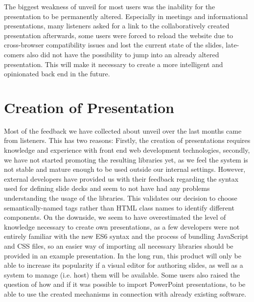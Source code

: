 The biggest weakness of unveil for most users was the inability for the presentation to be permanently altered. Especially in meetings and informational presentations, many listeners asked for a link to the collaboratively created presentation afterwards, some users were forced to reload the website due to cross-browser compatibility issues and lost the current state of the slides, late-comers also did not have the possibility to jump into an already altered presentation. This will make it necessary to create a more intelligent and opinionated back end in the future.

\section{Creation of Presentation}
Most of the feedback we have collected about unveil over the last months came from listeners. This has two reasons: Firstly, the creation of presentations requires knowledge and experience with front end web development technologies, secondly, we have not started promoting the resulting libraries yet, as we feel the system is not stable and mature enough to be used outside our internal settings. However, external developers have provided us with their feedback regarding the syntax used for defining slide decks and seem to not have had any problems understanding the usage of the libraries. This validates our decision to choose semantically-named tags rather than HTML class names to identify different components. On the downside, we seem to have overestimated the level of knowledge necessary to create own presentations, as a few developers were not entirely familiar with the new ES6 syntax and the process of bundling JavaScript and CSS files, so an easier way of importing all necessary libraries should be provided in an example presentation.
In the long run, this product will only be able to increase its popularity if a visual editor for authoring slides, as well as a system to manage (i.e. host) them will be available. Some users also raised the question of how and if it was possible to import PowerPoint presentations, to be able to use the created mechanisms in connection with already existing software.

